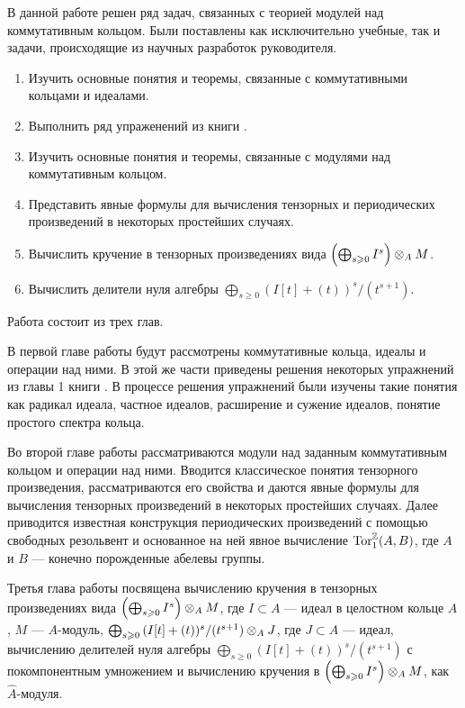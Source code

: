 В данной работе решен ряд задач, связанных с теорией модулей над коммутативным кольцом.
Были поставлены как исключительно учебные, так и задачи, происходящие из научных разработок руководителя.
\begin{enumerate}
    \item Изучить основные понятия и теоремы, связанные с коммутативными кольцами и идеалами.
    \item Выполнить ряд упраженений из книги \cite{A-M}.
    \item Изучить основные понятия и теоремы, связанные с модулями над коммутативным кольцом.
    \item Представить явные формулы для вычисления тензорных и периодических произведений в некоторых 
          простейших случаях.
    \item Вычислить кручение в тензорных произведениях вида $\left(\bigoplus_{s \geqslant 0} I^s \right) \otimes_A M$.
    \item Вычислить делители нуля алгебры $\bigoplus_{s \geq 0}{(I[t] + (t))^s / (t^{s + 1})}$.
\end{enumerate}
Работа состоит из трех глав.

В первой главе работы будут рассмотрены коммутативные кольца, идеалы и операции над ними. В этой же части приведены решения некоторых упражнений из главы 1 книги \cite{A-M}. В процессе 
решения упражнений были изучены такие понятия как радикал идеала, частное идеалов, расширение и сужение идеалов, понятие простого спектра кольца.

Во второй главе работы рассматриваются модули над заданным коммутативным кольцом и операции над ними. 
Вводится классическое понятия тензорного произведения, рассматриваются его свойства и даются 
явные формулы для вычисления тензорных произведений в некоторых простейших случаях. 
Далее приводится известная конструкция периодических произведений с помощью свободных резольвент и 
основанное на ней явное вычисление $\textup{Tor}_1^{\mathbb{Z}}(A, B)$, где $A$ и $B$ --- конечно порожденные абелевы группы.

Третья глава работы посвящена вычислению кручения в тензорных произведениях вида
$\left(\bigoplus_{s \geqslant 0} I^s \right) \otimes_A M$, где $I \subset A$ --- идеал в целостном кольце $A$, $M$ ---
$A$-модуль, $\bigoplus_{s \geqslant 0}{(I[t] + (t))^s / (t^{s + 1})} \otimes_A J$, где $J \subset A$ --- идеал,
вычислению делителей нуля алгебры $\bigoplus_{s \geq 0}{(I[t] + (t))^s / (t^{s + 1})}$ с покомпонентным
умножением и вычислению кручения в $\left(\bigoplus_{s \geqslant 0} I^s \right) \otimes_A M$, как $\hat A$-модуля.
